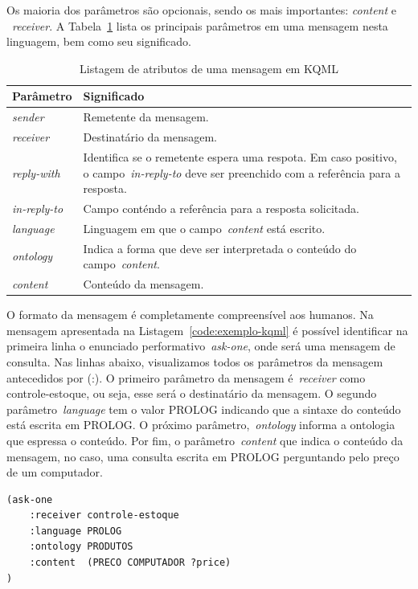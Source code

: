 Os maioria dos parâmetros são opcionais, sendo os mais importantes: \emph{content} e ~\emph{receiver}. A Tabela~\ref{parametros_kqml} lista os principais parâmetros em uma mensagem nesta linguagem, bem como seu significado.

\begin{table}
	\caption{Listagem de atributos de uma mensagem em KQML}
	\begin{tabular}{|p{3cm} | p{12cm} |}
		\hline
		\textbf{Parâmetro}	& \textbf{Significado}	\\
		\hline
		\emph{sender}		& Remetente da mensagem. \\
		\hline
		\emph{receiver}	& Destinatário da mensagem. \\
		\hline
		\emph{reply-with}	& Identifica se o remetente espera uma respota. Em caso positivo, o campo~\emph{in-reply-to} deve ser preenchido com a referência para a resposta. \\
		\hline
		\emph{in-reply-to}	& Campo conténdo a referência para a resposta solicitada. \\
		\hline
		\emph{language}	& Linguagem em que o campo~\emph{content} está escrito. \\ 
		\hline
		\emph{ontology}	& Indica a forma que deve ser interpretada o conteúdo do campo~\emph{content}. \\
		\hline
		\emph{content}		& Conteúdo da mensagem. \\
		\hline
	\end{tabular}
	\label{parametros_kqml}
\end{table}
O formato da mensagem é completamente compreensível aos humanos. Na mensagem apresentada na Listagem~\ref{code:exemplo-kqml} é possível identificar na primeira linha o enunciado performativo~\emph{ask-one}, onde será uma mensagem de consulta. Nas linhas abaixo, visualizamos todos os parâmetros da mensagem antecedidos por (:). O primeiro parâmetro da mensagem é~\emph{receiver} como controle-estoque, ou seja, esse será o destinatário da mensagem. O segundo parâmetro~\emph{language} tem o valor PROLOG indicando que a sintaxe do conteúdo está escrita em PROLOG. O próximo parâmetro,~\emph{ontology} informa a ontologia que espressa o conteúdo. Por fim, o parâmetro~\emph{content} que indica o conteúdo da mensagem, no caso, uma consulta escrita em PROLOG perguntando pelo preço de um computador.

\begin{lstlisting}[label=code:exemplo-kqml,caption=Exemplo de mensagem em KQML]
(ask-one
	:receiver controle-estoque
	:language PROLOG
	:ontology PRODUTOS
	:content  (PRECO COMPUTADOR ?price)
)
\end{lstlisting}

